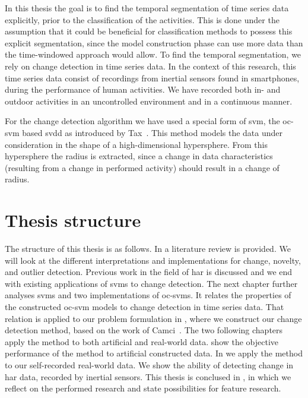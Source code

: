 In this thesis the goal is to find the temporal segmentation of time series data explicitly, prior to the classification of the activities.
This is done under the assumption that it could be beneficial for classification methods to possess this explicit segmentation, since the model construction phase can use more data than the time-windowed approach would allow.
To find the temporal segmentation, we rely on change detection in time series data.
In the context of this research, this time series data consist of recordings from inertial sensors found in smartphones, during the performance of human activities.
We have recorded both in- and outdoor activities in an uncontrolled environment and in a continuous manner.

For the change detection algorithm we have used a special form of \gls{svm}, the \gls{oc-svm} based \gls{svdd} as introduced by Tax~\cite{tax2001one}.
This method models the data under consideration in the shape of a high-dimensional hypersphere.
From this hypersphere the radius is extracted, since a change in data characteristics (resulting from a change in performed activity) should result in a change of radius.





\section{Thesis structure}
The structure of this thesis is as follows.
In  a literature review is provided.
We will look at the different interpretations and implementations for change, novelty, and outlier detection.
Previous work in the field of \gls{har} is discussed and we end with existing applications of \glspl{svm} to change detection.
The next chapter further analyses \glspl{svm} and two implementations of \glspl{oc-svm}.
It relates the properties of the constructed \gls{oc-svm} models to change detection in time series data.
That relation is applied to our problem formulation in , where we construct our change detection method, based on the work of Camci~\cite{camci2010change}.
The two following chapters apply the method to both artificial and real-world data.
 show the objective performance of the method to artificial constructed data.
In  we apply the method to our self-recorded real-world data.
We show the ability of detecting change in \gls{har} data, recorded by inertial sensors.
This thesis is conclused in , in which we reflect on the performed research and state possibilities for feature research.
